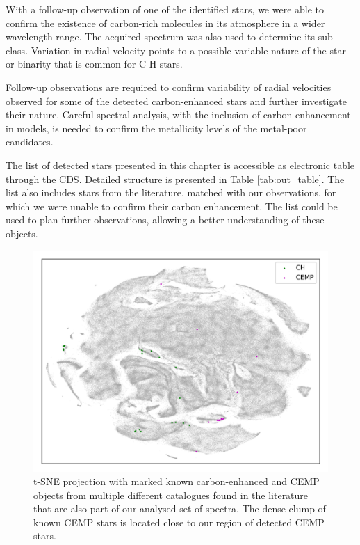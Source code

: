With a follow-up observation of one of the identified stars, we were able to confirm the existence of carbon-rich molecules in its atmosphere in a wider wavelength range. The acquired spectrum was also used to determine its sub-class. Variation in radial velocity points to a possible variable nature of the star or binarity that is common for C-H stars.

Follow-up observations are required to confirm variability of radial velocities observed for some of the detected carbon-enhanced stars and further investigate their nature. Careful spectral analysis, with the inclusion of carbon enhancement in models, is needed to confirm the metallicity levels of the metal-poor candidates. 

The list of detected stars presented in this chapter is accessible as electronic table through the CDS. Detailed structure is presented in Table \ref{tab:out_table}. The list also includes stars from the literature, matched with our observations, for which we were unable to confirm their carbon enhancement. The list could be used to plan further observations, allowing a better understanding of these objects.

\begin{figure}
	\centering
	\includegraphics[width=\textwidth]{tsne_refpapers.png}
	\caption{t-SNE projection with marked known carbon-enhanced and CEMP objects from multiple different catalogues found in the literature that are also part of our analysed set of spectra. The dense clump of known CEMP stars is located close to our region of detected CEMP stars.}
	\label{fig:tsne_ref_ch}
\end{figure}

